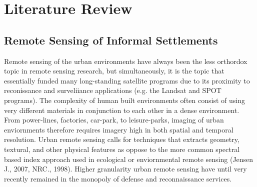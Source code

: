 \documentclass[11pt, a4paper, twoside]{report}
\begin{document}
\chapter{Literature Review}\label{LitReview}

\section{Remote Sensing of Informal Settlements}\label{RSofInformalSettlement}

Remote sensing of the urban environments have always been the less orthordox topic in remote sensing research, but simultaneously, it is the topic that essentially funded many long-standing satellite programs due to its proximity to reconissance and surveliiance applications (e.g. the Landsat and SPOT programs). The complexity of human built environments often consist of using very different materials in conjunction to each other in a dense environment. From power-lines, factories, car-park, to leisure-parks, imaging of urban enviornments therefore requires imagery high in both spatial and temporal resolution. Urban remote sensing calls for techniques that extracts geometry, textural, and other physical features as oppose to the more common spectral based index approach used in ecological or enviornmental remote sensing (Jensen J., 2007, NRC., 1998). Higher granularity urban remote sensing have until very recently remained in the monopoly of defense and reconnaissance services.\\\par
\end{document}
